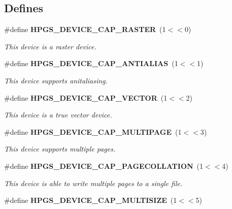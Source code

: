 \subsection*{Defines}
\begin{DoxyCompactItemize}
\item 
\#define {\bf HPGS\_\-DEVICE\_\-CAP\_\-RASTER}~(1$<$$<$0)\label{group__device_ga8175e4398fb6e52394c50e931f8cf693}

\begin{DoxyCompactList}\small\item\em This device is a raster device. \item\end{DoxyCompactList}\item 
\#define {\bf HPGS\_\-DEVICE\_\-CAP\_\-ANTIALIAS}~(1$<$$<$1)\label{group__device_gabfbaca61af5c0e6faef1ad7a562f3329}

\begin{DoxyCompactList}\small\item\em This device supports anitaliasing. \item\end{DoxyCompactList}\item 
\#define {\bf HPGS\_\-DEVICE\_\-CAP\_\-VECTOR}~(1$<$$<$2)\label{group__device_ga83df9d5e409b8b6c76d218cac0a6e0a1}

\begin{DoxyCompactList}\small\item\em This device is a true vector device. \item\end{DoxyCompactList}\item 
\#define {\bf HPGS\_\-DEVICE\_\-CAP\_\-MULTIPAGE}~(1$<$$<$3)\label{group__device_gae56cf76d457f9ee8dd758b10d6bd10e5}

\begin{DoxyCompactList}\small\item\em This device supports multiple pages. \item\end{DoxyCompactList}\item 
\#define {\bf HPGS\_\-DEVICE\_\-CAP\_\-PAGECOLLATION}~(1$<$$<$4)\label{group__device_ga47c1e796774cc9019de505639ba2d8b4}

\begin{DoxyCompactList}\small\item\em This device is able to write multiple pages to a single file. \item\end{DoxyCompactList}\item 
\#define {\bf HPGS\_\-DEVICE\_\-CAP\_\-MULTISIZE}~(1$<$$<$5)\label{group__device_ga74b3043329761f6c48088374cb2645d0}


\end{DoxyCompactItemize}
